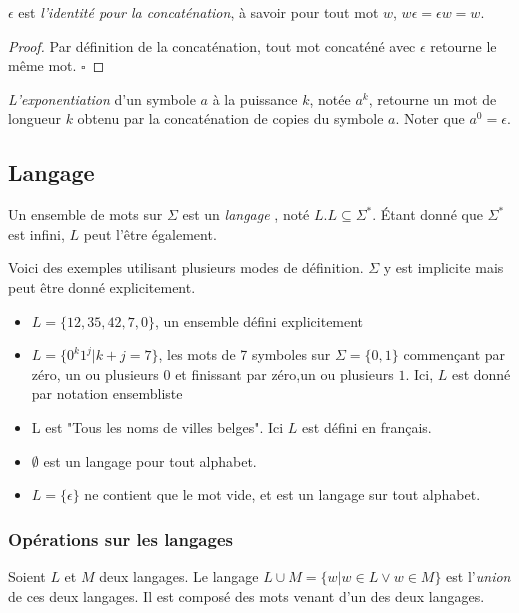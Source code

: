 \begin{lemma}
	$\epsilon$ est \emph{l'identité pour la concaténation}, à savoir pour tout mot $w$, $w\epsilon = \epsilon w = w$.
\end{lemma}

\begin{proof}
	Par définition de la concaténation, tout mot concaténé avec $\epsilon$ retourne le même mot. 
	\hfill$\square$
\end{proof}

\emph{L'exponentiation} d'un symbole $a$ à la puissance $k$, notée $a^k$, retourne un mot de longueur $k$ obtenu par la concaténation de copies du symbole $a$. Noter que $a^0=\epsilon$.

\subsection{Langage}

Un ensemble de mots sur $\Sigma$ est un \emph{langage} \cite{Hopcroft00}, noté $L$.$L \subseteq \Sigma^*$. Étant donné que $\Sigma^*$ est infini, $L$ peut l'être également.

\begin{example} Voici des exemples utilisant plusieurs modes de définition. $\Sigma$ y est implicite mais peut être donné explicitement.
	\begin{itemize}
		\item $L=\{12,35,42,7,0\}$, un ensemble défini explicitement
		\item $L=\{0^k1^j|k+j=7\}$, les mots de 7 symboles sur $\Sigma=\{0,1\}$ commençant par zéro, un ou plusieurs $0$ et finissant par zéro,un ou plusieurs $1$. Ici, $L$ est donné par notation ensembliste
		\item L est "Tous les noms de villes belges". Ici $L$ est défini en français.
		\item $\emptyset$ est un langage pour tout alphabet.
		\item $L=\{\epsilon\}$ ne contient que le mot vide, et est un langage sur tout alphabet.
	\end{itemize}
\end{example}


\subsubsection*{Opérations sur les langages}

Soient $L$ et $M$ deux langages. Le langage $L \cup M = \{w | w \in L\vee w \in M\}$ est l'\emph{union} de ces deux langages. Il est composé des mots venant d'un des deux langages.

